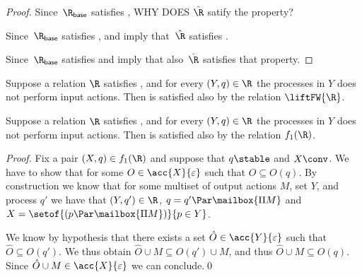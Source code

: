 {\begin{proof}
    Since~$\Rbase$ satisfies ,
    WHY DOES $\hat{\R}$ satify the property?

    Since~$\Rbase$ satisfies ,
     and 
    imply that~$\hat{\R}$ satisfies .

    Since~$\Rbase$ satisfies 
     and 
    imply that also~$\hat{\R}$ satisfies that property.
  \end{proof}


  \begin{lemma}
    \label{lem:liftFW-preserves-coind-acceptance-sets}
    Suppose a relation $\R$ satisfies ,
    and for every $(Y,q) \in {\R}$ the processes in $Y$ does not perform input actions.
    Then  is satisfied also by the relation $\liftFW{\R}$.
  \end{lemma}

  
  \begin{lemma}
    \label{lem:f1-preserves-coind-acceptance-sets}
    Suppose a relation $\R$ satisfies ,
    and for every $(Y,q) \in {\R}$ the processes in $Y$ does not perform input actions.
    Then  is satisfied also by the relation $f_1(\R)$.
  \end{lemma}
  \begin{proof}
    Fix a pair $(X, q) \in f_1(\R)$ and suppose that $q \stable$ and $X \conv$.
    We have to show that for some $ O \in \acc{X}{\varepsilon}$ such that $O \subseteq O(q)$.
    By construction we know that for some multiset of output actions $M$, set $Y$,
    and process $q'$ we have that 
    $(Y, q') \in {\R}$, $q = q' \Par \mailbox{\Pi M}$ and
    $X = \setof{ (p \Par \mailbox{\Pi M}) }{ p \in Y } $.

    We know by hypothesis that there exists a set $\hat{O} \in \acc{Y}{\varepsilon}$
    such that $\hat{O} \subseteq O(q')$.
    We thus obtain $ \hat{O}\cup M \subseteq O(q') \cup M$,
    and thus $\hat{O} \cup M \subseteq O(q)$.
    Since $\hat{O} \cup M \in \acc{X}{\varepsilon}$ we can conclude.\qed
  \end{proof}


}
